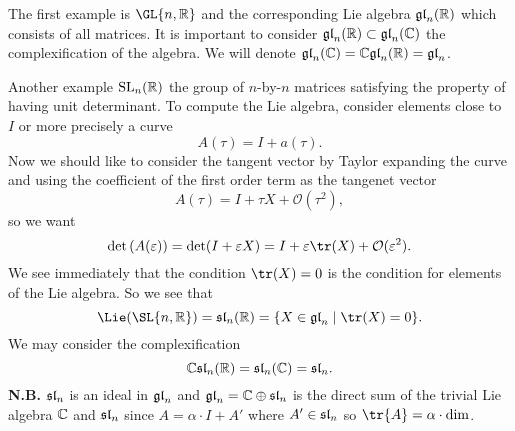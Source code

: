 
The first example is $\GL{n,\Bbb{R}}$ and the corresponding Lie
algebra $\frak{gl}_{n}(\Bbb{R})$ which consists of all
matrices. It is important to consider
$\frak{gl}_{n}(\Bbb{R})\subset\frak{gl}_{n}(\Bbb{C})$ the
complexification of the algebra. We will denote
$\frak{gl}_{n}(\Bbb{C})=\Bbb{C}\frak{gl}_{n}(\Bbb{R})=\frak{gl}_{n}$.

Another example ${\rm SL}_{n}(\Bbb{R})$ the group of $n$-by-$n$
matrices satisfying the property of having unit determinant. To
compute the Lie algebra, consider elements close to $I$ or more
precisely a curve
\begin{equation}
A(\tau)=I+a(\tau).
\end{equation}
Now we should like to consider the tangent vector by Taylor
expanding the curve and using the coefficient of the first order
term as the tangenet vector
\begin{equation}
A(\tau)=I+\tau X+\mathcal{O}(\tau^{2}),
\end{equation}
so we want
\begin{equation}
\det\left(A(\varepsilon)\right)=\det(I+\varepsilon X)=I+\varepsilon\tr(X)+\mathcal{O}(\varepsilon^{2}).
\end{equation}
We see immediately that the condition $\tr(X)=0$ is the condition
for elements of the Lie algebra. So we see that
\begin{equation}
\Lie(\SL{n,\Bbb{R}})=\frak{sl}_{n}(\Bbb{R})=\{X\in\frak{gl}_{n}\mid\tr(X)=0\}.
\end{equation}
We may consider the complexification
\begin{equation}
\Bbb{C}\frak{sl}_{n}(\Bbb{R})=\frak{sl}_{n}(\Bbb{C})=\frak{sl}_{n}.
\end{equation}
{\bf N.B.} $\frak{sl}_{n}$ is an ideal in $\frak{gl}_{n}$ and
$\frak{gl}_{n}=\Bbb{C}\oplus\frak{sl}_{n}$ is the direct sum of
the trivial Lie algebra $\Bbb{C}$ and $\frak{sl}_{n}$ since
$A=\alpha\cdot I+A'$ where $A'\in\frak{sl}_{n}$ so
$\tr{A}=\alpha\cdot{\rm dim}$.

